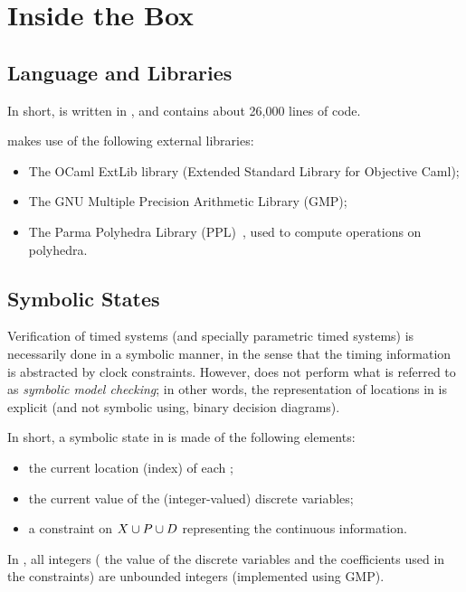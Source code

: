 \chapter{Inside the Box}


\section{Language and Libraries}

In short, \imitator{} is written in \ocaml{}, and contains about 26,000 lines of code.

\imitator{} makes use of the following external libraries:

\begin{itemize}
	\item The OCaml ExtLib library (Extended Standard Library for Objective Caml);
	\item The GNU Multiple Precision Arithmetic Library (GMP);
	\item The Parma Polyhedra Library (PPL)~\cite{bhz08}, used to compute operations on polyhedra.
\end{itemize}


\section{Symbolic States}

Verification of timed systems (and specially parametric timed systems) is necessarily done in a symbolic manner, in the sense that the timing information is abstracted by clock constraints.
However, \imitator{} does not perform what is referred to as \emph{symbolic model checking}; in other words, the representation of locations in \imitator{} is explicit (and not symbolic using, \eg{} binary decision diagrams).


In short, a symbolic state in \imitator{} is made of the following elements:
\begin{itemize}
	\item the current location (index) of each \IPTA{};
	\item the current value of the (integer-valued) discrete variables;
	\item a constraint on $X \cup P \cup D$ representing the continuous information.
\end{itemize}
In \imitator{}, all integers (\ie{} the value of the discrete variables and the coefficients used in the constraints) are unbounded integers (implemented using GMP).



